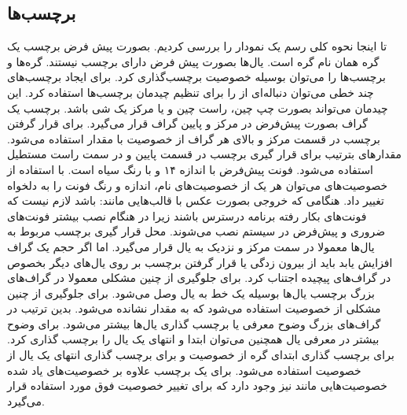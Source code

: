 \subsection{برچسب‌ها}
تا اینجا نحوه کلی رسم یک نمودار را بررسی کردیم. بصورت پیش فرض برچسب یک گره همان نام گره است. یال‌ها بصورت پیش فرض دارای برچسب نیستند. گره‌ها و برچسب‌ها را می‌توان بوسیله خصوصیت 
برچسب‌گذاری کرد. برای ایجاد برچسب‌های چند خطی می‌توان دنباله‌ای از 
را برای تنظیم چیدمان برچسب‌ها استفاده کرد. این چیدمان می‌تواند بصورت چپ چین، راست چین و یا مرکز یک شی باشد. برچسب یک گراف بصورت پیش‌فرض در مرکز و پایین گراف قرار می‌گیرد. برای قرار گرفتن برچسب در قسمت مرکز و بالای هر گراف از خصوصیت 
با مقدار  استفاده می‌شود. مقدارهای  بترتیب برای قرار گیری برچسب در قسمت پایین و در سمت راست مستطیل استفاده می‌شود. فونت پیش‌فرض با اندازه ۱۴ و  با رنگ سیاه است. با استفاده از خصوصیت‌های 
می‌توان هر یک از خصوصیت‌های نام، اندازه و رنگ فونت را به دلخواه تغییر داد. 
هنگامی که خروجی بصورت عکس با قالب‌هایی مانند: 
باشد لازم نیست که فونت‌های بکار رفته برنامه درسترس باشند زیرا در هنگام نصب 
بیشتر فونت‌های ضروری و پیش‌فرض در سیستم نصب می‌شوند.
محل قرار گیری برچسب مربوط به یال‌ها معمولا در سمت مرکز و نزدیک به یال قرار می‌گیرد. اما اگر حجم یک گراف افزایش یابد باید از بیرون زدگی یا قرار گرفتن برچسب بر روی یال‌‌های دیگر بخصوص در گراف‌های پیچیده اجتناب کرد. برای جلوگیری از چنین مشکلی معمولا در گراف‌های بزرگ برچسب یال‌ها بوسیله یک خط به یال وصل می‌شود. برای جلوگیری از چنین مشکلی از خصوصیت  استفاده می‌شود که به مقدار  نشانده می‌شود. بدین ترتیب در گراف‌های بزرگ وضوح معرفی یا برچسب گذاری یال‌ها بیشتر می‌شود.
برای وضوح بیشتر در معرفی یال همچنین می‌توان ابتدا و انتهای یک یال را برچسب گذاری کرد. برای برچسب گذاری ابتدای گره از خصوصیت  و برای برچسب گذاری انتهای یک یال از خصوصیت  استفاده می‌شود. 
برای یک برچسب علاوه بر خصوصیت‌های یاد شده خصوصیت‌هایی مانند 
نیز وجود دارد که برای تغییر خصوصیت فوق مورد استفاده قرار می‌گیرد.

